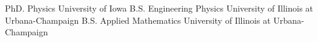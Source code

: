 % 
%
\begin{cventries}
  \cventry%
  {}
  {PhD. Physics}
  {University of Iowa}
  {}{}
  \vspace{-0.9cm}
  \cventrycustom%
  {}
  {B.S. Engineering Physics}
  {University of Illinois at Urbana-Champaign}
  {}{}
  \vspace{-0.9cm}
  \cventrycustom%
  {}
  {B.S. Applied Mathematics}
  {University of Illinois at Urbana-Champaign}
  {}{} 
\end{cventries}
%
%
%
%
%
%
